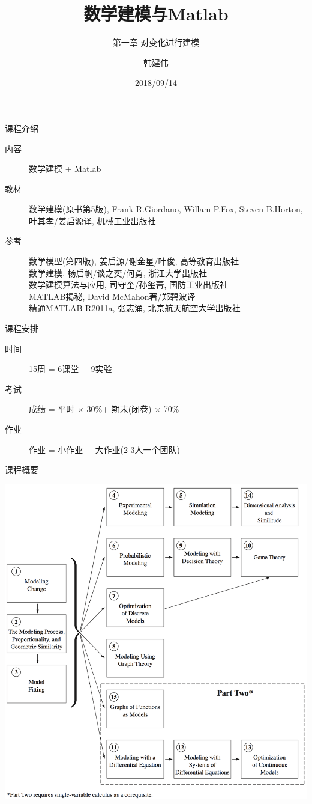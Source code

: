\documentclass[UTF8]{ctexbeamer}
\title{数学建模与Matlab}
\subtitle{第一章 对变化进行建模}
\author{韩建伟}
\institute{
  计算机学院
}
\date{2018/09/14}
\begin{document}
\begin{frame}[plain]
  \titlepage{}
\end{frame}

\begin{frame}{课程介绍}

\begin{description}
\item[内容] 数学建模 + Matlab
\item[教材] 数学建模(原书第5版), Frank R.Giordano, Willam P.Fox, Steven B.Horton, 叶其孝/姜启源译, 机械工业出版社
\item[参考] 数学模型(第四版), 姜启源/谢金星/叶俊, 高等教育出版社\\
  数学建模, 杨启帆/谈之奕/何勇, 浙江大学出版社\\
  数学建模算法与应用, 司守奎/孙玺菁, 国防工业出版社 \\
  MATLAB揭秘, David McMahon著/郑碧波译\\
  精通MATLAB R2011a, 张志涌, 北京航天航空大学出版社
\end{description}
  
\end{frame}

\begin{frame}{课程安排}
  \begin{description}
  \item[时间] 15周 = 6课堂 + 9实验
  \item[考试] 成绩 = 平时 $\times$ 30\%+ 期末(闭卷) $\times$ 70\%
  \item[作业] 作业 = 小作业 + 大作业(2-3人一个团队)
  \end{description}
\end{frame}

\begin{frame}{课程概要}
  \begin{center}
    \includegraphics[height=.8\textheight{}]{book-overview.png}
  \end{center}
\end{frame}
\end{document}
